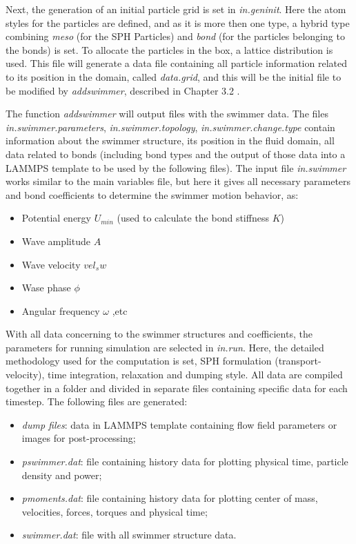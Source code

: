 Next, the generation of an initial particle grid is set in \textit{in.geninit}. Here the atom styles for the particles are defined, and as it is more then one type, a hybrid type
combining \textit{meso} (for the SPH Particles) and \textit{bond} (for the particles belonging to the bonds) is set. To allocate the particles in the box, a lattice distribution is used.
This file will generate a data file containing all particle information related to its position in the domain, called \textit{data.grid}, and this will be the initial file to be 
modified by \textit{addswimmer}, described in Chapter 3.2 . \par
The function \textit{addswimmer} will output files with the swimmer data. The files \textit{in.swimmer.parameters}, \textit{in.swimmer.topology}, \textit{in.swimmer.change.type}
contain information about the swimmer structure, its position in the fluid domain, all data related to bonds (including bond types and the  output of those data into a LAMMPS
template to be used by the following files). The input file \textit{in.swimmer} works similar to the main variables file, but here it gives all necessary parameters and bond
coefficients to determine the swimmer motion behavior, as:

\begin{itemize}
  \item Potential energy $U_{min}$ (used to calculate the bond stiffness $K$)
  \item Wave amplitude $A$ 
  \item Wave velocity $vel_sw$
  \item Wase phase $\phi$
  \item Angular frequency $\omega$ ,etc
\end{itemize}

With all data concerning to the swimmer structures and coefficients, the parameters for running simulation are selected in \textit{in.run}. Here, the detailed methodology used
for the computation is set, SPH formulation (transport-velocity), time integration, relaxation and dumping style. All data are compiled together in a folder and divided in 
separate files containing specific data for each timestep. The following files are generated:

\begin{itemize}
  \item \textit{dump files}: data in LAMMPS template containing flow field parameters or images for post-processing; 
  \item \textit{pswimmer.dat}: file containing history data for plotting physical time, particle density and power;  
  \item \textit{pmoments.dat}: file containing history data for plotting center of mass, velocities, forces, torques and physical time; 
  \item \textit{swimmer.dat}: file with all swimmer structure data.
\end{itemize}



